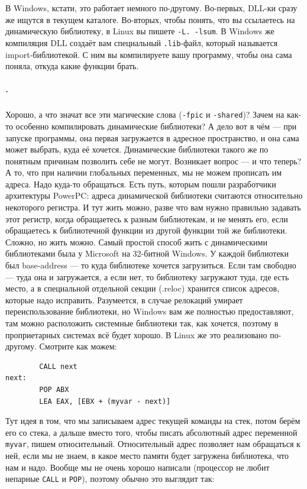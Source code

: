\documentclass{article}
\newcommand{\asm}[1]{\texttt{#1}}
\begin{document}
    В Windows, кстати, это работает немного по-другому. Во-первых, DLL-ки сразу же ищутся в текущем каталоге. Во-вторых, чтобы понять, что вы ссылаетесь на динамическую библиотеку, в Linux вы пишете \texttt{-L. -lsum}. В Windows же компиляция DLL создаёт вам специальный \texttt{.lib}-файл, который называется import-библиотекой. С ним вы компилируете вашу программу, чтобы она сама поняла, откуда какие функции брать.
    \subparagraph{.}
    Хорошо, а что значат все эти магические слова (\texttt{-fpic} и \texttt{-shared})? Зачем на как-то особенно компилировать динамические библиотеки? А дело вот в чём --- при запуске программы, она первая загружается в адресное пространство, и она сама может выбрать, куда её хочется. Динамические библиотеки такого же по понятным причинам позволить себе не могут. Возникает вопрос --- и что теперь? А то, что при наличии глобальных переменных, мы не можем прописать им адреса. Надо куда-то обращаться. Есть путь, которым пошли разработчики архитектуры PowerPC: адреса динамической библиотеки считаются относительно некоторого регистра. И тут жить можно, разве что вам нужно правильно задавать этот регистр, когда обращаетесь к разным библиотекам, и не менять его, если обращаетесь к библиотечной функции из другой функции той же библиотеки. Сложно, но жить можно. Самый простой способ жить с динамическими библиотеками была у Microsoft на 32-битной Windows. У каждой библиотеки был base-address --- то куда библиотеке хочется загрузиться. Если там свободно --- туда она и загружается, а если нет, то библиотеку загружают туда, где есть место, а в специальной отдельной секции (.reloc) хранится список адресов, которые надо исправить. Разумеется, в случае релокаций умирает переиспользование библиотеки, но Windows вам же полностью предоставляют, там можно расположить системные библиотеки так, как хочется, поэтому в проприетарных системах всё будет хорошо. В Linux же это реализовано по-другому. Смотрите как можем:
    \begin{verbatim}
        CALL next
next:
        POP ABX
        LEA EAX, [EBX + (myvar - next)]
    \end{verbatim}
    Тут идея в том, что мы записываем адрес текущей команды на стек, потом берём его со стека, а дальше вместо того, чтобы писать абсолютный адрес переменной \texttt{myvar}, пишем относительный. Относительный адрес позволяет нам обращаться к ней, если мы не знаем, в какое место памяти будет загружена библиотека, что нам и надо. Вообще мы не очень хорошо написали (процессор не любит непарные \asm{CALL} и \asm{POP}), поэтому обычно это выглядит так:
\end{document}
